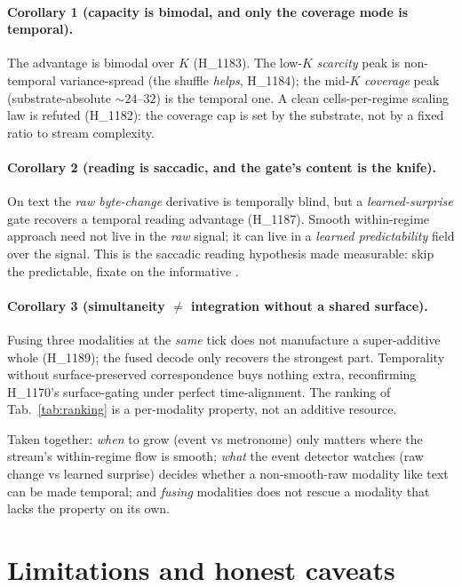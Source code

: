 \documentclass[11pt,a4paper]{article}
\begin{document}
\paragraph{Corollary 1 (capacity is bimodal, and only the coverage mode is
temporal).} The advantage is bimodal over $K$ (H\_1183). The low-$K$
\emph{scarcity} peak is non-temporal variance-spread (the shuffle \emph{helps},
H\_1184); the mid-$K$ \emph{coverage} peak (substrate-absolute $\sim24$--$32$) is
the temporal one. A clean cells-per-regime scaling law is refuted (H\_1182): the
coverage cap is set by the substrate, not by a fixed ratio to stream complexity.

\paragraph{Corollary 2 (reading is saccadic, and the gate's content is the knife).}
On text the \emph{raw byte-change} derivative is temporally blind, but a
\emph{learned-surprise} gate recovers a temporal reading advantage (H\_1187).
Smooth within-regime approach need not live in the \emph{raw} signal; it can live
in a \emph{learned predictability} field over the signal. This is the saccadic
reading hypothesis made measurable: skip the predictable, fixate on the
informative \citep{rayner2009eye,smith2013logarithmic}.

\paragraph{Corollary 3 (simultaneity $\neq$ integration without a shared surface).}
Fusing three modalities at the \emph{same} tick does not manufacture a
super-additive whole (H\_1189); the fused decode only recovers the strongest part.
Temporality without surface-preserved correspondence buys nothing extra,
reconfirming H\_1170's surface-gating \citep{anima_h1170} under perfect
time-alignment. The ranking of Tab.~\ref{tab:ranking} is a per-modality property,
not an additive resource.

\medskip
\noindent Taken together: \emph{when} to grow (event vs metronome) only matters
where the stream's within-regime flow is smooth; \emph{what} the event detector
watches (raw change vs learned surprise) decides whether a non-smooth-raw modality
like text can be made temporal; and \emph{fusing} modalities does not rescue a
modality that lacks the property on its own.

\section{Limitations and honest caveats}
\label{sec:limits}
\end{document}
